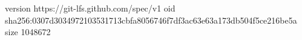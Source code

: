 version https://git-lfs.github.com/spec/v1
oid sha256:0307d3034972103531713cbfa8056746f7df3ac63e63a173db504f5ce216be5a
size 1048672
